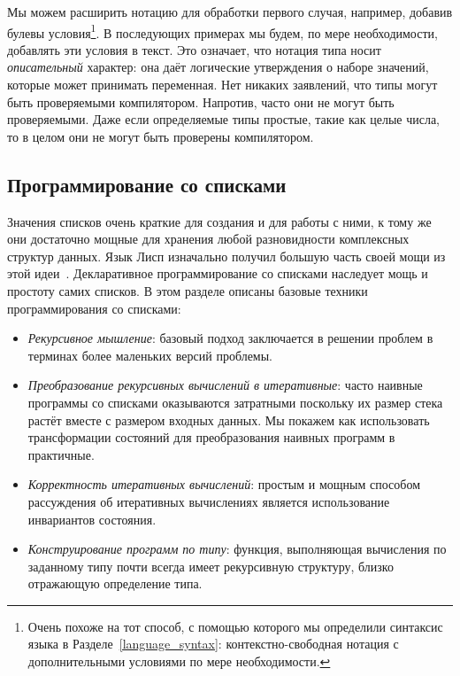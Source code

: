 Мы можем расширить нотацию для обработки первого случая, например, добавив булевы условия\footnote{Очень похоже на тот способ, с помощью которого мы определили синтаксис языка в Разделе~\ref{language_syntax}: контекстно-свободная нотация с дополнительными условиями по мере необходимости.}. В последующих примерах мы будем, по мере необходимости, добавлять эти условия в текст.  Это означает, что нотация типа носит \emph{описательный} характер: она даёт логические утверждения о наборе значений, которые может принимать переменная. Нет никаких заявлений, что типы могут быть проверяемыми компилятором. Напротив, часто они не могут быть проверяемыми. Даже если определяемые типы простые, такие как целые числа, то в целом они не могут быть проверены компилятором.

\subsection{Программирование со списками}

Значения списков очень краткие для создания и для работы с ними, к тому же они достаточно мощные для хранения любой разновидности комплексных структур данных. Язык Лисп изначально получил большую часть своей мощи из этой идеи~\cite{120}. Декларативное программирование со списками наследует мощь и простоту самих списков. В этом разделе описаны базовые техники программирования со списками:

\begin{itemize}
\item{\emph{Рекурсивное мышление}: базовый подход заключается в решении проблем в терминах более маленьких версий проблемы.}

\item{\emph{Преобразование рекурсивных вычислений в итеративные}: часто наивные программы со списками оказываются затратными поскольку их размер стека растёт вместе с размером входных данных. Мы покажем как использовать трансформации состояний для преобразования наивных программ в практичные.}

\item{\emph{Корректность итеративных вычислений}: простым и мощным способом рассуждения об итеративных вычислениях является использование инвариантов состояния.}

\item{\emph{Конструирование программ по типу}: функция, выполняющая вычисления по заданному типу почти всегда имеет рекурсивную структуру, близко отражающую определение типа.}
\end{itemize}

